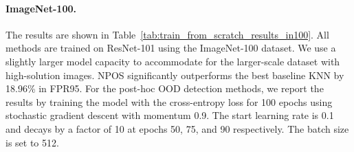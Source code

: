 \paragraph{ImageNet-100.} The results are shown in Table~\ref{tab:train_from_scratch_results_in100}. All methods are trained on ResNet-101 using the ImageNet-100 dataset. We use a slightly larger model capacity  to accommodate for the larger-scale dataset with high-solution images. NPOS significantly outperforms the best baseline KNN by 18.96\% in FPR95. For the post-hoc OOD detection methods, we report the results by training the model with the cross-entropy loss for 100 epochs using stochastic gradient descent with momentum 0.9. The start learning rate is 0.1 and decays by a factor of 10 at epochs 50, 75, and 90 respectively. The batch size is set to 512.




